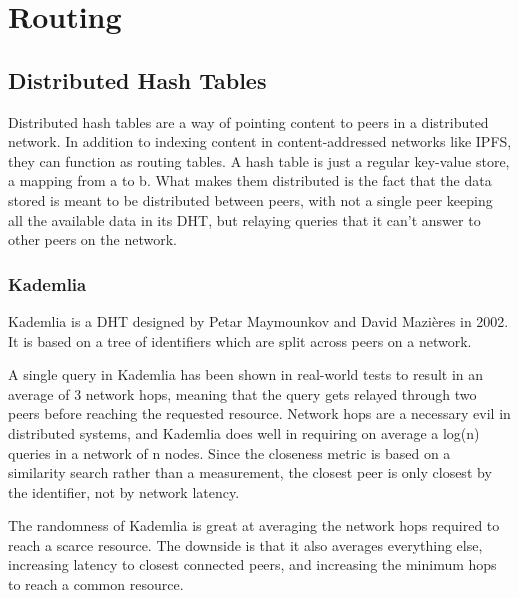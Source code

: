 \section{Routing}
						
						
\subsection{Distributed Hash Tables}
Distributed hash tables are a way of pointing content to peers in a distributed network. In addition to indexing content in content-addressed networks like IPFS, they can function as routing tables. A hash table is just a regular key-value store, a mapping from a to b. What makes them distributed is the fact that the data stored is meant to be distributed between peers, with not a single peer keeping all the available data in its DHT, but relaying queries that it can't answer to other peers on the network.
						
\subsubsection{Kademlia}
Kademlia is a DHT designed by Petar Maymounkov and David Mazières in 2002. It is based on a tree of identifiers which are split across peers on a network.
						
A single query in Kademlia has been shown in real-world tests to result in an average of 3 network hops, meaning that the query gets relayed through two peers before reaching the requested resource.\cite{Roos2013-mb} Network hops are a necessary evil in distributed systems, and Kademlia does well in requiring on average a log(n) queries in a network of n nodes. Since the closeness metric is based on a similarity search rather than a measurement, the closest peer is only closest by the identifier, not by network latency.\cite{Eigenmann2020-zm}
						
The randomness of Kademlia is great at averaging the network hops required to reach a scarce resource. The downside is that it also averages everything else, increasing latency to closest connected peers, and increasing the minimum hops to reach a common resource.
